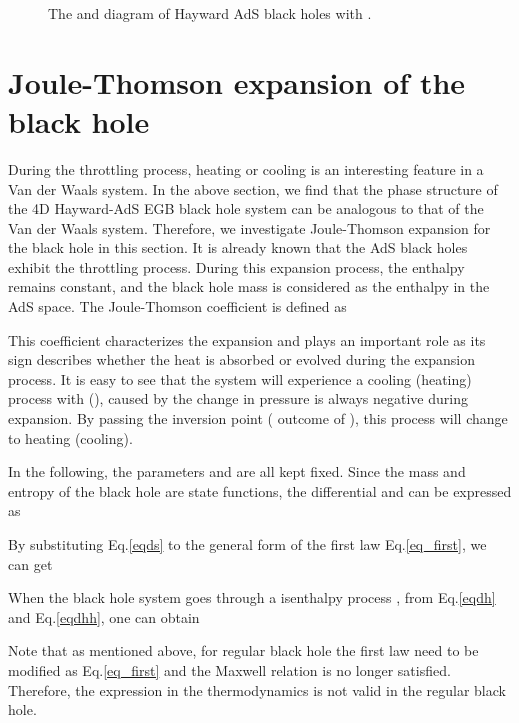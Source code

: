 \documentclass[aps,11pt]{revtex4}
\begin{document}
\begin{figure}[htb]
\centering
{}
\hfill
{}
\hfill
\caption{The  and  diagram of Hayward AdS black holes with .}\label{figpg}
\end{figure}

\section{Joule-Thomson expansion of the black hole}
\label{2s}

During the throttling process, heating or cooling is an interesting feature in a Van der Waals system. In the above section, we find that the phase structure of the 4D Hayward-AdS EGB black hole system can be analogous to that of the Van der Waals system. Therefore, we investigate Joule-Thomson expansion for the black hole in this section. It is already known that the AdS black holes exhibit the throttling process\cite{Okcu:2016tgt,Okcu:2017qgo,Rizwan:2018mpy}. During this expansion process, the enthalpy remains constant, and the black hole mass is considered as the enthalpy in the AdS space. The Joule-Thomson coefficient  is defined as

This coefficient characterizes the expansion and plays an important role as its sign describes whether the heat is absorbed or evolved during the expansion process. It is easy to see that the system will experience a cooling (heating) process with  (), caused by the change in pressure is always negative during expansion. By passing the inversion point ( outcome of ), this process will change to heating (cooling).

In the following, the parameters  and  are all kept fixed. Since the mass and entropy of the black hole are state functions, the differential  and  can be expressed as

By substituting Eq.\ref{eqds} to the general form of the first law Eq.\ref{eq_first}, we can get

When the black hole system goes through a isenthalpy process , from Eq.\ref{eqdh} and Eq.\ref{eqdhh}, one can obtain

Note that as mentioned above, for regular black hole the first law need to be modified as Eq.\ref{eq_first} and the Maxwell relation is no longer satisfied. Therefore, the expression  in the thermodynamics is not valid in the regular black hole.
\end{document}
